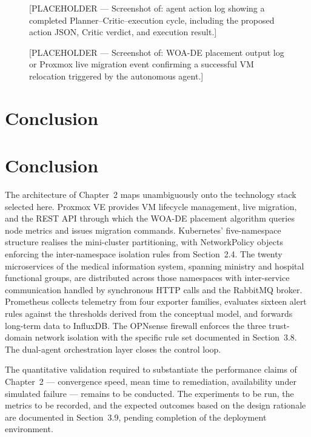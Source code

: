 \documentclass[12pt,a4paper]{report}
\begin{document}
\begin{figure}[htbp]
\centering
\fbox{\rule{0pt}{4.5cm}\rule{0.9\linewidth}{0pt}}
\caption{[PLACEHOLDER --- Screenshot of: agent action log showing a completed
Planner--Critic--execution cycle, including the proposed action JSON, Critic
verdict, and execution result.]}
\label{fig:placeholder_action_log}
\end{figure}

\begin{figure}[htbp]
\centering
\fbox{\rule{0pt}{4.5cm}\rule{0.9\linewidth}{0pt}}
\caption{[PLACEHOLDER --- Screenshot of: WOA-DE placement output log or Proxmox
live migration event confirming a successful VM relocation triggered by the
autonomous agent.]}
\label{fig:placeholder_woa_output}
\end{figure}

\section{Conclusion}

\section{Conclusion}

The architecture of Chapter~2 maps unambiguously onto the technology stack selected
here. Proxmox VE provides VM lifecycle management, live migration, and the REST API
through which the WOA-DE placement algorithm queries node metrics and issues
migration commands. Kubernetes' five-namespace structure realises the mini-cluster
partitioning, with NetworkPolicy objects enforcing the inter-namespace isolation
rules from Section~2.4. The twenty microservices of the medical information system,
spanning ministry and hospital functional groups, are distributed across those
namespaces with inter-service communication handled by synchronous HTTP calls and
the RabbitMQ broker. Prometheus collects telemetry from four exporter families,
evaluates sixteen alert rules against the thresholds derived from the conceptual
model, and forwards long-term data to InfluxDB. The OPNsense firewall enforces the
three trust-domain network isolation with the specific rule set documented in
Section~3.8. The dual-agent orchestration layer closes the control loop.

The quantitative validation required to substantiate the performance claims of
Chapter~2 --- convergence speed, mean time to remediation, availability under
simulated failure --- remains to be conducted. The experiments to be run, the metrics
to be recorded, and the expected outcomes based on the design rationale are
documented in Section~3.9, pending completion of the deployment environment.
\end{document}
